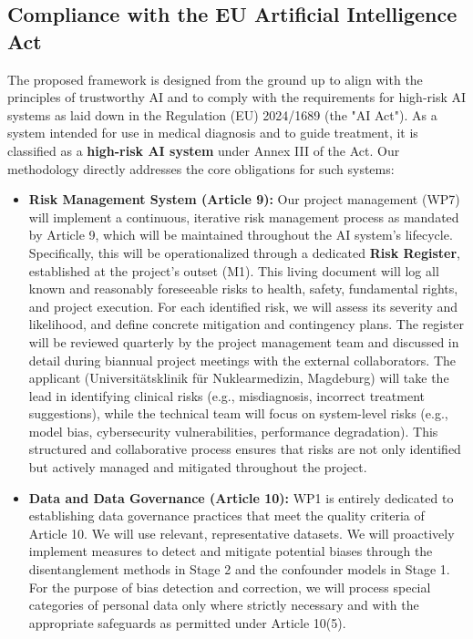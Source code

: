\documentclass[11pt, a4paper]{article}
\begin{document}
\subsection{Compliance with the EU Artificial Intelligence Act}
The proposed framework is designed from the ground up to align with the principles of trustworthy AI and to comply with the requirements for high-risk AI systems as laid down in the Regulation (EU) 2024/1689 (the "AI Act"). As a system intended for use in medical diagnosis and to guide treatment, it is classified as a \textbf{high-risk AI system} under Annex III of the Act. Our methodology directly addresses the core obligations for such systems:

\begin{itemize}
    \item \textbf{Risk Management System (Article 9):} Our project management (WP7) will implement a continuous, iterative risk management process as mandated by Article 9, which will be maintained throughout the AI system’s lifecycle. Specifically, this will be operationalized through a dedicated \textbf{Risk Register}, established at the project's outset (M1). This living document will log all known and reasonably foreseeable risks to health, safety, fundamental rights, and project execution. For each identified risk, we will assess its severity and likelihood, and define concrete mitigation and contingency plans. The register will be reviewed quarterly by the project management team and discussed in detail during biannual project meetings with the external collaborators. The applicant (Universitätsklinik für Nuklearmedizin, Magdeburg) will take the lead in identifying clinical risks (e.g., misdiagnosis, incorrect treatment suggestions), while the technical team will focus on system-level risks (e.g., model bias, cybersecurity vulnerabilities, performance degradation). This structured and collaborative process ensures that risks are not only identified but actively managed and mitigated throughout the project.

    \item \textbf{Data and Data Governance (Article 10):} WP1 is entirely dedicated to establishing data governance practices that meet the quality criteria of Article 10. We will use relevant, representative datasets. We will proactively implement measures to detect and mitigate potential biases through the disentanglement methods in Stage 2 and the confounder models in Stage 1. For the purpose of bias detection and correction, we will process special categories of personal data only where strictly necessary and with the appropriate safeguards as permitted under Article 10(5).


\end{itemize}
\end{document}
